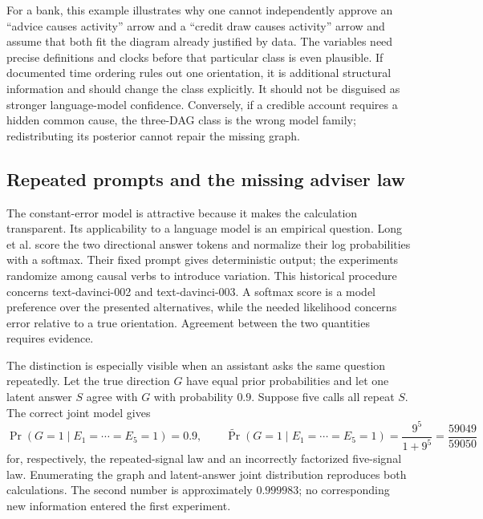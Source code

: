 For a bank, this example illustrates why one cannot independently approve an
``advice causes activity'' arrow and a ``credit draw causes activity'' arrow
and assume that both fit the diagram already justified by data. The variables
need precise definitions and clocks before that particular class is even
plausible. If documented time ordering rules out one orientation, it is
additional structural information and should change the class explicitly.
It should not be disguised as stronger language-model confidence. Conversely,
if a credible account requires a hidden common cause, the three-DAG class is
the wrong model family; redistributing its posterior cannot repair the missing
graph.

\subsection{Repeated prompts and the missing adviser law}

The constant-error model is attractive because it makes the calculation
transparent. Its applicability to a language model is an empirical question.
Long et al. score the two directional answer tokens and normalize their log
probabilities with a softmax. Their fixed prompt gives deterministic output;
the experiments randomize among causal verbs to introduce variation. This
historical procedure concerns text-davinci-002 and text-davinci-003. A softmax
score is a model preference over the presented alternatives, while the needed
likelihood concerns error relative to a true orientation. Agreement between
the two quantities requires evidence.~\citep{exec17_imperfect_experts}

The distinction is especially visible when an assistant asks the same question
repeatedly. Let the true direction $G$ have equal prior probabilities and let
one latent answer $S$ agree with $G$ with probability $0.9$. Suppose five calls
all repeat $S$. The correct joint model gives
\begin{equation}
 \Pr(G=1\mid E_1=\cdots=E_5=1)=0.9,
 \qquad
 \widetilde\Pr(G=1\mid E_1=\cdots=E_5=1)
        =\frac{9^5}{1+9^5}=\frac{59049}{59050}
\label{exec17:advice-repetition}
\end{equation}
for, respectively, the repeated-signal law and an incorrectly factorized
five-signal law. Enumerating the graph and latent-answer joint distribution
reproduces both calculations. The second number is approximately $0.999983$;
no corresponding new information entered the first experiment.
\citep{exec17_advice_validity_exact}

